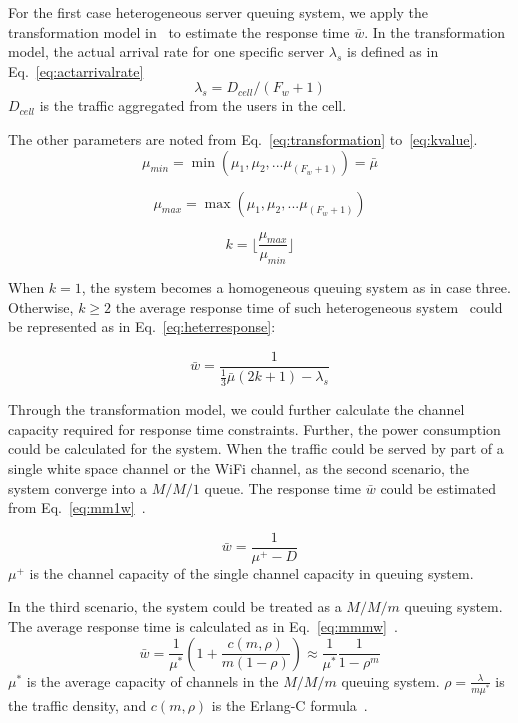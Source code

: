 For the first case heterogeneous server queuing system, we apply the transformation model 
in~\cite{yu2008transformation} to estimate the response time $\bar{w}$. 
In the transformation model, the actual arrival rate for one specific server $\lambda_s$ is 
defined as in Eq.~\ref{eq:actarrivalrate}
\begin{equation}
\label{eq:actarrivalrate}
\lambda_s=D_{cell}/(F_w+1)
\end{equation}
$D_{cell}$ is the traffic aggregated from the users in the cell.

The other parameters are noted from Eq.~\ref{eq:transformation} to~\ref{eq:kvalue}.
\begin{equation}
\label{eq:transformation}
\mu_{min}=\min{(\mu_1,\mu_2,...\mu_{(F_w+1)})} = \bar{\mu}
\end{equation}

\begin{equation}
\mu_{max}=\max{(\mu_1,\mu_2,...\mu_{(F_w+1)})} 
\end{equation}

\begin{equation}
\label{eq:kvalue}
k= \lfloor\frac{\mu_{max}}{\mu_{min}} \rfloor
\end{equation}

When $k=1$, the system becomes a homogeneous queuing system as in case three. Otherwise,   
$k\ge2$ the average response time of such heterogeneous system~\cite{yu2008transformation} 
could be represented as in Eq.~\ref{eq:heterresponse}:

\begin{equation}
\label{eq:heterresponse}
\bar{w}=\frac{1}{\frac{1}{3}\bar{\mu}(2k+1)-\lambda_s}
\end{equation}

Through the transformation model, we could further calculate the channel capacity required for 
response time constraints. Further, the power consumption could be calculated for the system.
When the traffic could be served by part of a single white space channel or the WiFi channel, as 
the second scenario, the system converge into a $M/M/1$ queue. The response time $\bar{w}$ 
could be estimated from Eq.~\ref{eq:mm1w}~\cite{gelenbe1998introduction}.

\begin{equation}
\label{eq:mm1w}
\bar{w}=\frac{1}{\mu^+-D}
\end{equation}
$\mu^+$ is the channel capacity of the single channel capacity in queuing system.

In the third scenario, the system could be treated as a $M/M/m$ queuing system. 
The average response time is calculated as in Eq.~\ref{eq:mmmw}~\cite{gelenbe1998introduction}.
\begin{equation}
\label{eq:mmmw}
\bar{w} = \frac{1}{\mu^*}(1+\frac{c(m,\rho)}{m(1-\rho)})\approx \frac{1}{\mu^*}\frac{1}{1-\rho^m}
\end{equation}
$\mu^*$ is the average capacity of channels in the $M/M/m$ queuing system.
$\rho=\frac{\lambda}{m\mu^*}$ is the traffic density, and $c(m,\rho)$ is the Erlang-C 
formula~\cite{gelenbe1998introduction}.



